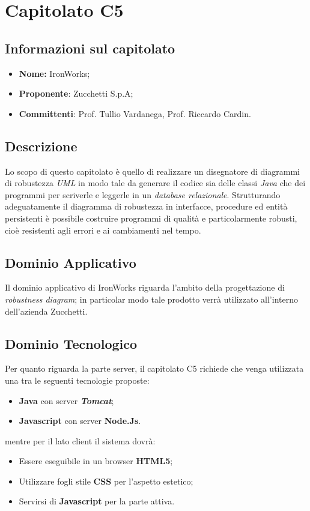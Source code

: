 \section{Capitolato C5}
\subsection{Informazioni sul capitolato}
	\begin{itemize}
		\item \textbf{Nome:}
		IronWorks;
		\item \textbf{Proponente}:
		Zucchetti S.p.A;
		\item \textbf{Committenti}:
		Prof. Tullio Vardanega, Prof. Riccardo Cardin.
	\end{itemize}

\subsection{Descrizione}
	Lo scopo di questo capitolato è quello di realizzare un disegnatore di diagrammi di robustezza \textit{UML} in modo tale da generare il codice sia delle classi \textit{Java} che dei programmi per scriverle e leggerle in un \textit{database relazionale}.
	\newline \newline Strutturando adeguatamente il diagramma di robustezza in interfacce, procedure ed entità persistenti è possibile costruire programmi di qualità e particolarmente robusti, cioè resistenti agli errori e ai cambiamenti nel tempo.
	
\subsection{Dominio Applicativo}
	Il dominio applicativo di IronWorks riguarda l'ambito della progettazione di \textit{robustness diagram}; in particolar modo tale prodotto verrà utilizzato all'interno dell'azienda Zucchetti.
	
\subsection{Dominio Tecnologico}
	Per quanto riguarda la parte server, il capitolato C5 richiede che venga utilizzata una tra le seguenti tecnologie proposte:
	\begin{itemize}
		\item \textbf{Java} con server \textit{\textbf{Tomcat}};
		\item \textbf{Javascript} con server \textbf{Node.Js}.
	\end{itemize}
	mentre per il lato client il sistema dovrà:
	\begin{itemize}
		\item Essere eseguibile in un browser \textbf{HTML5};
		\item Utilizzare fogli stile \textbf{CSS} per l’aspetto estetico;
		\item Servirsi di \textbf{Javascript} per la parte attiva.
	\end{itemize}
	
